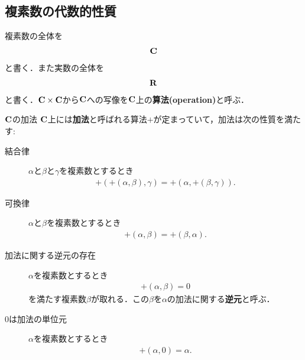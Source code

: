 \subsection{複素数の代数的性質}

	複素数の全体を
	\begin{align}
		\mathbf{C}
	\end{align}
	と書く．また実数の全体を
	\begin{align}
		\mathbf{R}
	\end{align}
	と書く．$\mathbf{C} \times \mathbf{C}$から$\mathbf{C}$への写像を$\mathbf{C}$上の{\bf 算法}{\bf (operation)}と呼ぶ．
	
	\begin{itembox}[l]{$\mathbf{C}$の加法}
		$\mathbf{C}$上には{\bf 加法}と呼ばれる算法$+$が定まっていて，加法は次の性質を満たす:
		\begin{description}
			\item[結合律] $\alpha$と$\beta$と$\gamma$を複素数とするとき
				\begin{align}
					+\left(+(\alpha,\beta),\gamma\right) = +\left(\alpha,+(\beta,\gamma)\right).
				\end{align}
				
			\item[可換律]  $\alpha$と$\beta$を複素数とするとき
				\begin{align}
					+(\alpha,\beta) = +(\beta,\alpha).
				\end{align}
				
			\item[加法に関する逆元の存在] $\alpha$を複素数とするとき
				\begin{align}
					+(\alpha,\beta) = 0
				\end{align}
				を満たす複素数$\beta$が取れる．この$\beta$を$\alpha$の加法に関する{\bf 逆元}と呼ぶ．
				
			\item[$0$は加法の単位元] $\alpha$を複素数とするとき
				\begin{align}
					+(\alpha,0) = \alpha.
				\end{align}
		\end{description}
	\end{itembox}
	
